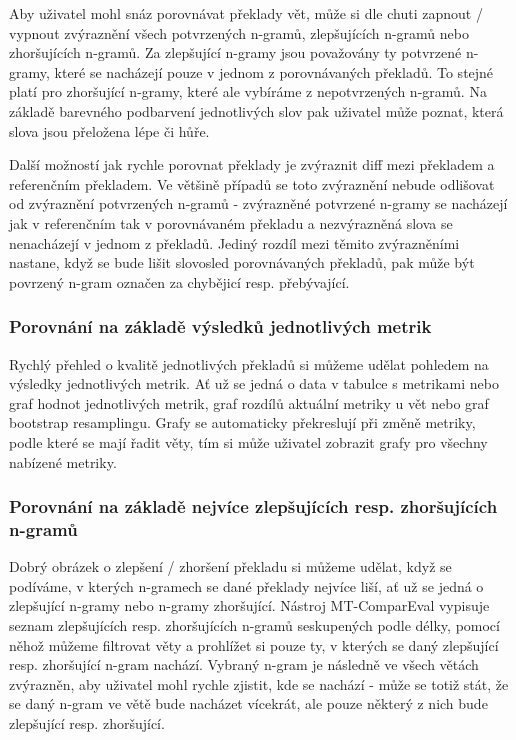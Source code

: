Aby uživatel mohl snáz porovnávat překlady vět,
  může si dle chuti zapnout / vypnout zvýraznění všech potvrzených n-gramů,
  zlepšujících n-gramů nebo zhoršujících n-gramů.
Za zlepšující n-gramy jsou považovány ty potvrzené n-gramy,
  které se nacházejí pouze v jednom z porovnávaných překladů.
To stejné platí pro zhoršující n-gramy,
  které ale vybíráme z nepotvrzených n-gramů.
Na základě barevného podbarvení jednotlivých slov pak uživatel může poznat,
  která slova jsou přeložena lépe či hůře.

Další možností jak rychle porovnat překlady je zvýraznit diff mezi překladem a referenčním překladem.
Ve většině případů se toto zvýraznění nebude odlišovat od zvýraznění potvrzených n-gramů -
  zvýrazněné potvrzené n-gramy se nacházejí jak v referenčním tak v porovnávaném překladu
  a nezvýrazněná slova se nenacházejí v jednom z překladů.
Jediný rozdíl mezi těmito zvýrazněními nastane,
  když se bude lišit slovosled porovnávaných překladů,
  pak může být povrzený n-gram označen za chybějicí resp. přebývající.

\subsubsection{Porovnání na základě výsledků jednotlivých metrik}
Rychlý přehled o kvalitě jednotlivých překladů si můžeme udělat pohledem na výsledky jednotlivých metrik.
Ať už se jedná o data v tabulce s metrikami nebo graf hodnot jednotlivých metrik,
  graf rozdílů aktuální metriky u vět nebo graf bootstrap resamplingu.
Grafy se automaticky překreslují při změně metriky,
  podle které se mají řadit věty,
  tím si může uživatel zobrazit grafy pro všechny nabízené metriky.


\subsubsection{Porovnání na základě nejvíce zlepšujících resp. zhoršujících n-gramů}
Dobrý obrázek o zlepšení / zhoršení překladu si můžeme udělat,
  když se podíváme,
  v kterých n-gramech se dané překlady nejvíce liší,
  ať už se jedná o zlepšující n-gramy nebo n-gramy zhoršující.
Nástroj MT-ComparEval vypisuje seznam zlepšujících resp. zhoršujících n-gramů seskupených podle délky,
  pomocí něhož můžeme filtrovat věty a prohlížet si pouze ty,
  v kterých se daný zlepšující resp. zhoršující n-gram nachází.
Vybraný n-gram je následně ve všech větách zvýrazněn,
  aby uživatel mohl rychle zjistit, kde se nachází -
  může se totiž stát, že se daný n-gram ve větě bude nacházet vícekrát,
  ale pouze některý z nich bude zlepšující resp. zhoršující.

